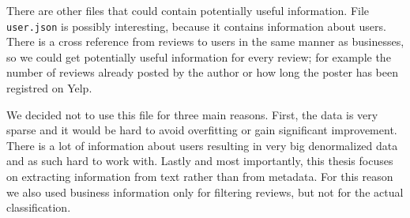 There are other files that could contain potentially useful information.
File \texttt{user.json} is possibly interesting, because it contains information about users.
There is a cross reference from reviews to users in the same manner as businesses,
so we could get potentially useful information for every review;
for example the number of reviews already posted by the author or
how long the poster has been registred on Yelp.

We decided not to use this file for three main reasons.
First, the data is very sparse and it would be hard to avoid overfitting or gain significant improvement.
There is a lot of information about users resulting in very big denormalized data
and as such hard to work with.
Lastly and most importantly, this thesis focuses on extracting information from text rather than from metadata.
For this reason we also used business information only for filtering reviews,
but not for the actual classification.

